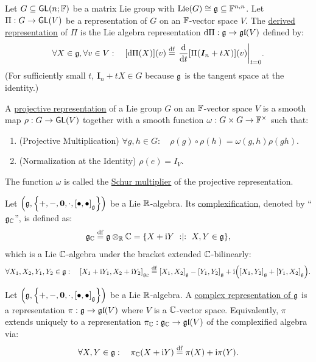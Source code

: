 \documentclass[11pt,reqno]{amsart}
\DeclareMathOperator{\Lie}{Lie}
\newcommand{\ii}{\mathrm{i}}
\begin{document}
\begin{Def}\label{def:derived-rep}
Let $G\subseteq\operatorname{\mathsf{GL}}(n;\mathbb{F})$ be a matrix Lie group with
$\Lie\Br{G}\cong\g\subseteq\F^{n,n}$.
Let $\Pi:G\to\operatorname{\mathsf{GL}}(V)$ be a representation of $G$ on an $\mathbb{F}$-vector space $V$.
The \ul{derived representation} of $\Pi$ is the Lie algebra representation
$\mathrm{d}\Pi:\mathfrak{g}\to\mathfrak{gl}(V)$ defined by:
\[
\forall X\in\g,\forall v\in V:\quad
\FUNC{\dd\Pi(X)}{v}\df
\eval{\frac{\dd}{\dd t}\FUNC{\Pi(\bm I_n + tX)}{v}}_{t=0}.
\]
(For sufficiently small $t$, $\bm I_n+tX\in G$ because $\mathfrak{g}$ is the tangent space
at the identity.)
\end{Def}


\begin{Def}
A \ul{projective representation} of a Lie group $G$ on an $\mathbb{F}$-vector space $V$
is a smooth map $\rho:G\to\operatorname{\mathsf{GL}}(V)$ together with a smooth function
$\omega:G\times G\to\mathbb{F}^\times$ such that:
\begin{enumerate}
\item (Projective Multiplication)
$\forall g,h\in G:\quad\rho(g)\circ\rho(h)=\omega(g,h)\rho(gh)$.
\item (Normalization at the Identity)
$\rho(e)=I_V$.
\end{enumerate}
The function $\omega$ is called the \ul{Schur multiplier}
of the projective representation.
\end{Def}

\begin{Def}
Let $\Br{\g,\set{+,-,\bm0,\cdot,\SqBr{\bullet,\bullet}_\g}}$ be a Lie $\mathbb{R}$-algebra.
Its \ul{complexification}, denoted by ``$\mathfrak{g}_{\mathbb{C}}$'', is defined as:
\[
\g_\C\df\g\otimes_\R\C
=\set{X+\ii Y\st X,Y\in\g},
\]
which is a Lie $\mathbb{C}$-algebra under the bracket extended $\mathbb{C}$-bilinearly:
\[
\forall X_1,X_2,Y_1,Y_2\in\g:\quad
\SqBr{X_1+\ii Y_1,X_2+\ii Y_2}_{\g_\C}
\df\SqBr{X_1,X_2}_\g-\SqBr{Y_1,Y_2}_\g
+\ii\Br{\SqBr{X_1,Y_2}_\g+\SqBr{Y_1,X_2}_\g}.
\]
\end{Def}

\begin{Def}
Let $\Br{\g,\set{+,-,\bm0,\cdot,\SqBr{\bullet,\bullet}_\g}}$ be a Lie $\mathbb{R}$-algebra.
A \ul{complex representation of $\mathfrak{g}$} is a representation
$\pi:\mathfrak{g}\to\mathfrak{gl}(V)$ where $V$ is a $\mathbb{C}$-vector space.
Equivalently, $\pi$ extends uniquely to a representation
$\pi_{\mathbb{C}}:\mathfrak{g}_{\mathbb{C}}\to\mathfrak{gl}(V)$ of the complexified algebra via:
\[
\forall X,Y\in\g:\quad
\pi_\C(X+\ii Y)\df\pi(X)+\ii\pi(Y).
\]
\end{Def}
\end{document}
